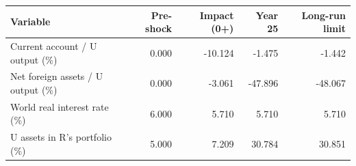 \begin{table}[!ht]
\setlength\tabcolsep{0.425em}
\setlength\aboverulesep{0pt}
\setlength\belowrulesep{0.2em}
\centering
\begin{threeparttable}
\begin{tabular}{lrrrr}
\toprule[0.1em]
\textbf{Variable} & \textbf{Pre-shock} & \textbf{Impact (0+)} & \textbf{Year 25} & \textbf{Long-run limit} \\[0.2em]
\midrule[0.075em]
Current account / U output (\%) & 0.000 & -10.124 & -1.475 & -1.442 \\[0.2em]
Net foreign assets / U output (\%) & 0.000 & -3.061 & -47.896 & -48.067 \\[0.2em]
World real interest rate (\%) & 6.000 & 5.710 & 5.710 & 5.710 \\[0.2em]
U assets in R's portfolio (\%) & 5.000 & 7.209 & 30.784 & 30.851 \\[0.2em]
\bottomrule[0.1em]
\end{tabular}
\end{threeparttable}
\end{table}
